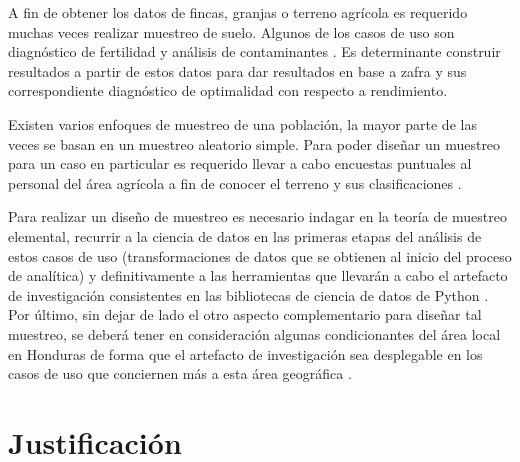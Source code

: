 \documentclass{report}
\begin{document}
\bigbreak

A fin de obtener los datos de fincas, granjas o terreno agrícola es requerido muchas veces realizar muestreo de suelo. Algunos de los casos de uso son diagnóstico de fertilidad \cite{lassaga-2011} y análisis de contaminantes \cite{gobpe-ministerio-del-ambiente-2014}. Es determinante construir resultados a partir de estos datos para dar resultados en base a zafra y sus correspondiente diagnóstico de optimalidad con respecto a rendimiento.

\bigbreak

Existen varios enfoques de muestreo de una población, la mayor parte de las veces se basan en un muestreo aleatorio simple. Para poder diseñar un muestreo para un caso en particular es requerido llevar a cabo encuestas puntuales al personal del área agrícola a fin de conocer el terreno y sus clasificaciones \cite{organizacion-de-las-naciones-unidas-para-la-agricultura-y-la-alimentacion-1990}.

\bigbreak

Para realizar un diseño de muestreo es necesario indagar en la teoría de muestreo elemental, recurrir a la ciencia de datos en las primeras etapas del análisis de estos casos de uso (transformaciones de datos que se obtienen al inicio del proceso de analítica) y definitivamente a las herramientas que llevarán a cabo el artefacto de investigación consistentes en las bibliotecas de ciencia de datos de Python \cite{grus-2015} \cite{geopandas-developers-2021}. Por último, sin dejar de lado el otro aspecto complementario para diseñar tal muestreo, se deberá tener en consideración algunas condicionantes del área local en Honduras de forma que el artefacto de investigación sea desplegable en los casos de uso que conciernen más a esta área geográfica \cite{fao-2004}.

\section{Justificación}
\end{document}
